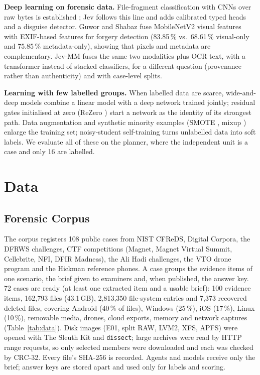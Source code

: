 \documentclass[conference]{IEEEtran}
\begin{document}
\textbf{Deep learning on forensic data.} File-fragment classification with CNNs over raw bytes is established
\cite{mittal2021}; Jev follows this line and adds calibrated typed heads and a disguise detector. Guwor and Shabaz
\cite{guwor2026} fuse MobileNetV2 visual features with EXIF-based features for forgery detection (83.85\,\% vs.\
68.61\,\% visual-only and 75.85\,\% metadata-only), showing that pixels and metadata are complementary. Jev-MM fuses
the same two modalities plus OCR text, with a transformer instead of stacked classifiers, for a different question
(provenance rather than authenticity) and with case-level splits.

\textbf{Learning with few labelled groups.} When labelled data are scarce, wide-and-deep models \cite{cheng2016}
combine a linear model with a deep network trained jointly; residual gates initialised at zero (ReZero
\cite{bachlechner2021}) start a network as the identity of its strongest path. Data augmentation and synthetic
minority examples (SMOTE \cite{chawla2002}, mixup \cite{zhang2018}) enlarge the training set; noisy-student
self-training \cite{xie2020} turns unlabelled data into soft labels. We evaluate all of these on the planner, where
the independent unit is a case and only 16 are labelled.

\section{Data}

\subsection{Forensic Corpus}
The corpus registers 108 public cases from NIST CFReDS, Digital Corpora, the DFRWS challenges, CTF competitions
(Magnet, Magnet Virtual Summit, Cellebrite, NFI, DFIR Madness), the Ali Hadi challenges, the VTO drone program and
the Hickman reference phones. A case groups the evidence items of one scenario, the brief given to examiners and,
when published, the answer key. 72 cases are ready (at least one extracted item and a usable brief): 100 evidence
items, 162{,}793 files (43.1\,GB), 2{,}813{,}350 file-system entries and 7{,}373 recovered deleted files, covering
Android (40\,\% of files), Windows (25\,\%), iOS (17\,\%), Linux (10\,\%), removable media, drones, cloud exports,
memory and network captures (Table~\ref{tab:data}). Disk images (E01, split RAW, LVM2, XFS, APFS) were opened with The
Sleuth Kit and \texttt{dissect}; large archives were read by HTTP range requests, so only selected members were
downloaded and each was checked by CRC-32. Every file's SHA-256 is recorded. Agents and models receive only the brief;
answer keys are stored apart and used only for labels and scoring.
\end{document}
